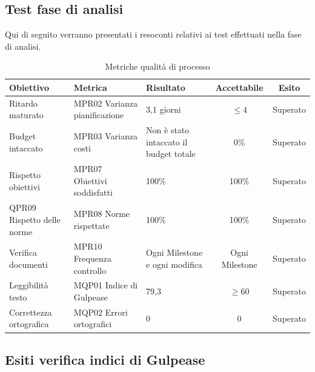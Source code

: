 \documentclass[../piano_di_qualifica.tex]{subfiles}
\begin{document}
\subsection{Test fase di analisi}
Qui di seguito verranno presentati i resoconti relativi ai test effettuati nella fase di analisi. \par

\begin{table}[!ht]
	\centering
	\begin{tabular}{|p{3cm}|p{3.3cm}|l|c|c|}
		\hline
		\rowcolor{lightgray}
		\textbf{Obiettivo}  & \textbf{Metrica} & \textbf{Risultato} & \textbf{Accettabile} & \textbf{Esito} \\
		\hline
		Ritardo maturato & MPR02 Varianza pianificazione  & 3,1 giorni  & \(\leq 4\) & Superato  \\
		\hline
		Budget intaccato   & MPR03 Varianza costi   &  Non è stato intaccato il budget totale    &  0\%  &  Superato\\
		\hline
		Rispetto obiettivi   & MPR07 Obiettivi soddisfatti     & 100\%   & 100\% & Superato  \\
		\hline
		QPR09 Rispetto delle norme  & MPR08 Norme rispettate   & 100\%  & 100\%   & Superato\\
		\hline
		Verifica documenti   & MPR10 Frequenza controllo    & Ogni Milestone e ogni modifica   & Ogni Milestone    & Superato \\
		\hline
		Leggibilità testo & MQP01 Indice di Gulpease  & 79,3  & \(\ge 60\)  & Superato \\
		\hline
		Correttezza ortografica   & MQP02 Errori ortografici   &     0    &  0 & Superato  \\
		\hline
	\end{tabular}
	\caption{Metriche qualità di processo}
\end{table}


\subsection{Esiti verifica indici di Gulpease}
\label{sub:verif_gul}
\end{document}
